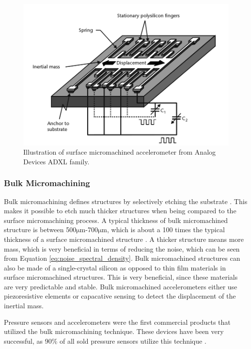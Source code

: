 \begin{figure}[h]
\centering
\includegraphics[scale=0.3]{fig/surface_micromachined.png}
\caption{Illustration of surface micromachined accelerometer from Analog Devices ADXL family. \cite[p.~101]{maluf04}}
\label{fig:surface_micromachined}
\end{figure}

\subsubsection{Bulk Micromachining}

Bulk micromachining defines structures by selectively etching the substrate \cite[p.~7]{kaajakari09}. This makes it possible to etch much thicker structures when being compared to the surface micromachining process. A typical thickness of bulk micromachined structure is between 500$\si{\micro\meter}$-700$\si{\micro\meter}$, which is about a 100 times the typical thickness of a surface micromachined structure \cite[p.~7]{kaajakari09}. A thicker structure means more mass, which is very beneficial in terms of reducing the noise, which can be seen from Equation \ref{eq:noise_spectral_density}. Bulk micromachined structures can also be made of a single-crystal silicon as opposed to thin film materials in surface micromachined structures. This is very beneficial, since these materials are very predictable and stable. Bulk micromachined accelerometers either use piezoresistive elements or capacative sensing to detect the displacement of the inertial mass.

Pressure sensors and accelerometers were the first commercial products that utilized the bulk micromachining technique. These devices have been very successful, as 90\% of all sold pressure sensors utilize this technique \cite[p.~7]{kaajakari09}. 

